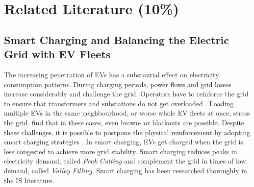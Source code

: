 \documentclass[12pt, article]{article}
\begin{document}
\section{Related Literature (10\%)}
\label{sec:org6164dda}
\subsection{Smart Charging and Balancing the Electric Grid with EV Fleets}
\label{sec:orga3ccbb1}
The increasing penetration of EVs has a substantial effect on electricity consumption
patterns. During charging periods, power flows and grid losses increase
considerably and challenge the grid. Operators have to reinforce the grid
to ensure that transformers and substations do not get overloaded
\parencite{sioshansi12_impac_elect_tarif_plug_in,lopes11_integ_elect_vehic_elect_power_system}.
Loading multiple EVs in the same neighbourhood, or worse whole EV fleets at
once, stress the grid. \textcite{kim12_carbit} find that in these cases, even
brown- or blackouts are possible. Despite these challenges, it is possible to
postpone the physical reinforcement by adopting smart charging strategies
\parencite{kim12_carbit}. In smart charging, EVs get charged when the grid is less
congested to achieve more grid stability. Smart charging reduces peaks in
electricity demand, called \emph{Peak Cutting} and complement the grid in times of
low demand, called \emph{Valley Filling}. Smart charging has been researched
thoroughly in the IS literature.
\end{document}
